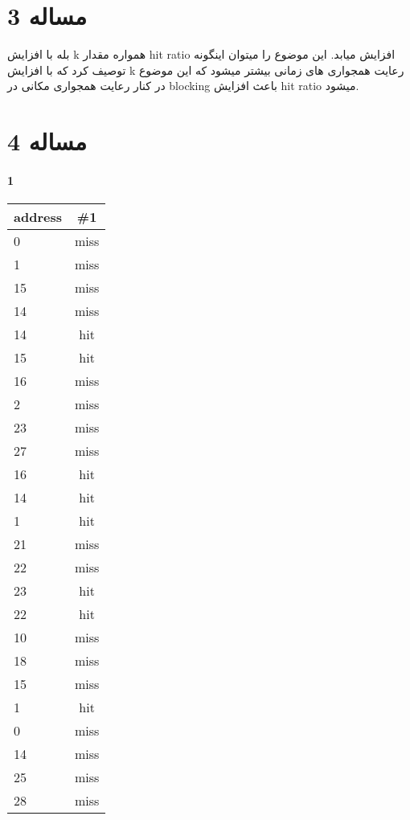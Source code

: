 \documentclass[11pt]{article}
\begin{document}
\section{مساله 3}
بله با افزایش k همواره مقدار hit ratio افزایش میابد. این موضوع را میتوان اینگونه توصیف کرد که با افزایش k رعایت همجواری های زمانی بیشتر میشود که این موضوع در کنار رعایت همجواری مکانی در blocking باعث افزایش hit ratio میشود.
\section{مساله 4}
\paragraph{1}
\begin{center}
	\begin{tabular}{l || c}
		address & \#1 \\
		\hline
		0  & miss \\
		1  & miss \\
		15 & miss \\
		14 & miss \\
		14 & hit  \\
		15 & hit  \\
		16 & miss \\
		2  & miss \\
		23 & miss \\
		27 & miss \\
		16 & hit  \\
		14 & hit  \\
		1  & hit  \\
		21 & miss \\
		22 & miss \\
		23 & hit  \\
		22 & hit  \\
		10 & miss \\
		18 & miss \\
		15 & miss \\
		1  & hit  \\
		0  & miss \\
		14 & miss \\
		25 & miss \\
		28 & miss \\
	\end{tabular}
\end{center}
\end{document}
